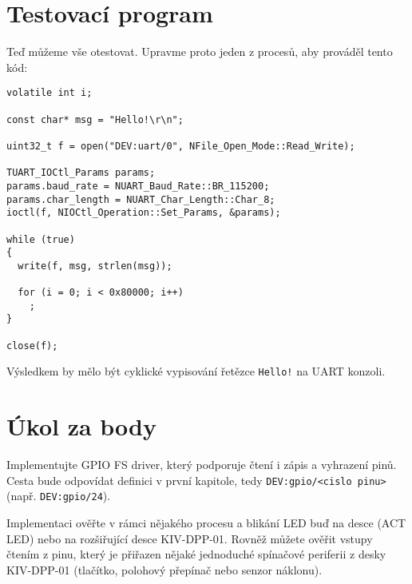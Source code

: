 \documentclass{article}
\begin{document}
\section{Testovací program}

Teď můžeme vše otestovat. Upravme proto jeden z procesů, aby prováděl tento kód:
\begin{lstlisting}
volatile int i;

const char* msg = "Hello!\r\n";

uint32_t f = open("DEV:uart/0", NFile_Open_Mode::Read_Write);

TUART_IOCtl_Params params;
params.baud_rate = NUART_Baud_Rate::BR_115200;
params.char_length = NUART_Char_Length::Char_8;
ioctl(f, NIOCtl_Operation::Set_Params, &params);

while (true)
{
  write(f, msg, strlen(msg));
	
  for (i = 0; i < 0x80000; i++)
    ;
}

close(f);
\end{lstlisting}
Výsledkem by mělo být cyklické vypisování řetězce \texttt{Hello!} na UART konzoli.



\section{Úkol za body}

Implementujte GPIO FS driver, který podporuje čtení i zápis a vyhrazení pinů. Cesta bude odpovídat definici v první kapitole, tedy \texttt{DEV:gpio/<cislo pinu>} (např. \texttt{DEV:gpio/24}).

Implementaci ověřte v rámci nějakého procesu a blikání LED buď na desce (ACT LED) nebo na rozšiřující desce KIV-DPP-01. Rovněž můžete ověřit vstupy čtením z pinu, který je přiřazen nějaké jednoduché spínačové periferii z desky KIV-DPP-01 (tlačítko, polohový přepínač nebo senzor náklonu).
\end{document}
